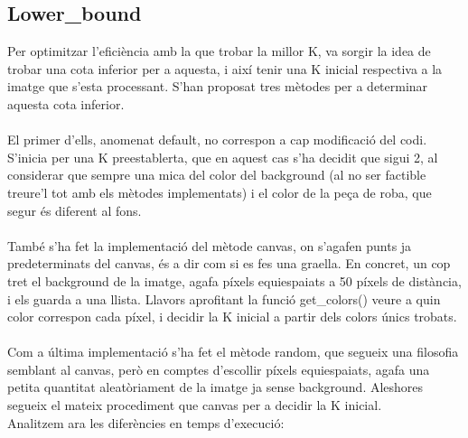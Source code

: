 \documentclass[a4paper, 11pt]{article}
\begin{document}
\subsection{Lower\_bound}
Per optimitzar l'eficiència amb la que trobar la millor K, va sorgir la idea de trobar una cota inferior per a aquesta, i així tenir una K inicial respectiva a la imatge que s'esta processant. S'han proposat tres mètodes per a determinar aquesta cota inferior.\\\\
El primer d'ells, anomenat default, no correspon a cap modificació del codi. S'inicia per una K preestablerta, que en aquest cas s'ha decidit que sigui 2, al considerar que sempre una mica del color del background (al no ser factible treure'l tot amb els mètodes implementats) i el color de la peça de roba, que segur és diferent al fons.\\\\
També s'ha fet la implementació del mètode canvas, on s'agafen punts ja predeterminats del canvas, és a dir com si es fes una graella. En concret, un cop tret el background de la imatge, agafa píxels equiespaiats a 50 píxels de distància, i els guarda a una llista. Llavors aprofitant la funció \textcolor{funcblue}{get\_colors()} veure a quin color correspon cada píxel, i decidir la K inicial a partir dels colors únics trobats.\\\\
Com a última implementació s'ha fet el mètode random, que segueix una filosofia semblant al canvas, però en comptes d'escollir píxels equiespaiats, agafa una petita quantitat aleatòriament de la imatge ja sense background. Aleshores segueix el mateix procediment que canvas per a decidir la K inicial.\\
Analitzem ara les diferències en temps d'execució:\\

\newpage
\end{document}
